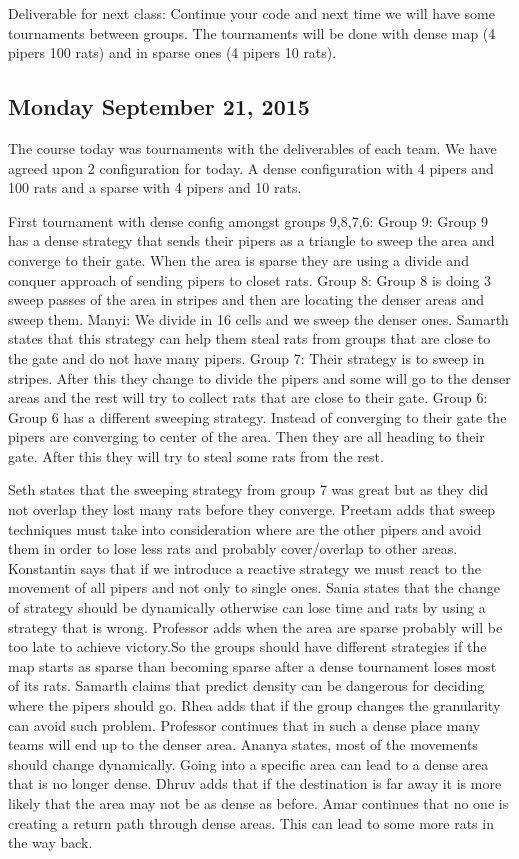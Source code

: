 Deliverable for next class:
Continue your code and next time we will have some tournaments between groups.
The tournaments will be done with dense map (4 pipers 100 rats) and in sparse ones (4 pipers 10 rats).

\subsection{Monday September 21, 2015}
The course today was tournaments with the deliverables of each team. We have agreed upon 2 configuration for today. A dense configuration with 4 pipers and 100 rats and a sparse with 4 pipers and 10 rats. 

First tournament with dense config amongst groups 9,8,7,6:
Group 9: Group 9 has a dense strategy that sends their pipers as a triangle to sweep the area and converge to their gate. When the area is sparse they are using a divide and conquer approach of sending pipers to closet rats.
Group 8: Group 8 is doing 3 sweep passes of the area in stripes and then are locating the denser areas and sweep them.
Manyi: We divide in 16 cells and we sweep the denser ones.
Samarth states that this strategy can help them steal rats from groups that are close to the gate and do not have many pipers.
Group 7: Their strategy is to sweep in stripes. After this they change to divide the pipers and some will go to the denser areas and the rest will try to collect rats that are close to their gate.
Group 6: Group 6 has a different sweeping strategy. Instead of converging to their gate the pipers are converging to center of the area. Then they are all heading to their gate. After this they will try to steal some rats from the rest.

Seth states that the sweeping strategy from group 7 was great but as they did not overlap they lost many rats before they converge.
Preetam adds that sweep techniques must take into consideration where are the other pipers and avoid them in order to lose less rats and probably cover/overlap to other areas.
Konstantin says that if we introduce a reactive strategy we must react to the movement of all pipers and not only to single ones.
Sania states that the change of strategy should be dynamically otherwise can lose time and rats by using a strategy that is wrong.
Professor adds when the area are sparse probably will be too late to achieve victory.So the groups should have different strategies if the map starts as sparse than becoming sparse after a dense tournament loses most of its rats.
Samarth claims that predict density can be dangerous for deciding where the pipers should go.
Rhea adds that if the group changes the granularity can avoid such problem.
Professor continues that in such a dense place many teams will end up to the denser area.
Ananya states, most of the movements should change dynamically. Going into a specific area can lead to a dense area that is no longer dense.
Dhruv adds that if the destination is far away it is more likely that the area may not be as dense as before.
Amar continues that no one is creating a return path through dense areas. This can lead to some more rats in the way back.

